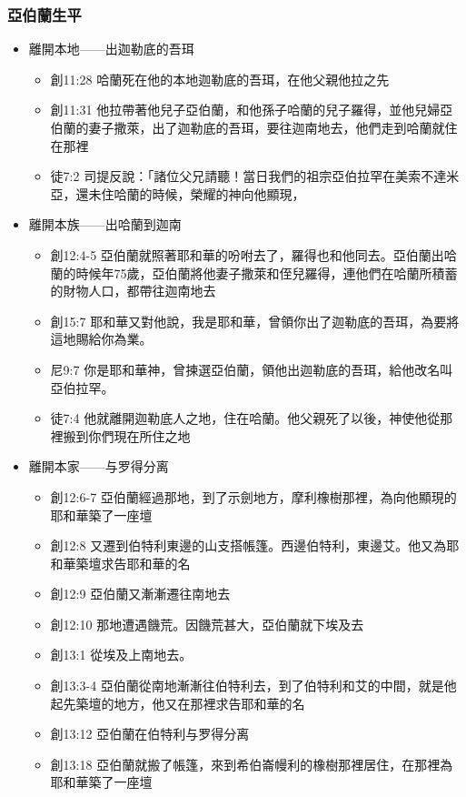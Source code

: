 \subsubsection{亞伯蘭生平}
\begin{itemize} 
\itemsep-.35em 
\item 離開本地——出迦勒底的吾珥
\begin{itemize} 
\itemsep-.35em 
\item 創11:28 哈蘭死在他的本地迦勒底的吾珥，在他父親他拉之先
\item 創11:31 他拉帶著他兒子亞伯蘭，和他孫子哈蘭的兒子羅得，並他兒婦亞伯蘭的妻子撒萊，出了迦勒底的吾珥，要往迦南地去，他們走到哈蘭就住在那裡
\item 徒7:2 司提反說：「諸位父兄請聽！當日我們的祖宗亞伯拉罕在美索不達米亞，還未住哈蘭的時候，榮耀的神向他顯現，
\end{itemize}
\item 離開本族——出哈蘭到迦南
\begin{itemize} 
\itemsep-.35em 
\item 創12:4-5 亞伯蘭就照著耶和華的吩咐去了，羅得也和他同去。亞伯蘭出哈蘭的時候年75歲，亞伯蘭將他妻子撒萊和侄兒羅得，連他們在哈蘭所積蓄的財物人口，都帶往迦南地去
\item 創15:7 耶和華又對他說，我是耶和華，曾領你出了迦勒底的吾珥，為要將這地賜給你為業。
\item 尼9:7 你是耶和華神，曾揀選亞伯蘭，領他出迦勒底的吾珥，給他改名叫亞伯拉罕。
\item 徒7:4 他就離開迦勒底人之地，住在哈蘭。他父親死了以後，神使他從那裡搬到你們現在所住之地
\end{itemize}
\item 離開本家——与罗得分离
\begin{itemize} 
\itemsep-.35em 
\item 創12:6-7 亞伯蘭經過那地，到了示劍地方，摩利橡樹那裡，為向他顯現的耶和華築了一座壇
\item 創12:8 又遷到伯特利東邊的山支搭帳篷。西邊伯特利，東邊艾。他又為耶和華築壇求告耶和華的名
\item 創12:9 亞伯蘭又漸漸遷往南地去
\item 創12:10 那地遭遇饑荒。因饑荒甚大，亞伯蘭就下埃及去
\item 創13:1 從埃及上南地去。
\item 創13:3-4 亞伯蘭從南地漸漸往伯特利去，到了伯特利和艾的中間，就是他起先築壇的地方，他又在那裡求告耶和華的名
\item 創13:12 亞伯蘭在伯特利与罗得分离
\item 創13:18 亞伯蘭就搬了帳篷，來到希伯崙幔利的橡樹那裡居住，在那裡為耶和華築了一座壇

\end{itemize}
\end{itemize}
